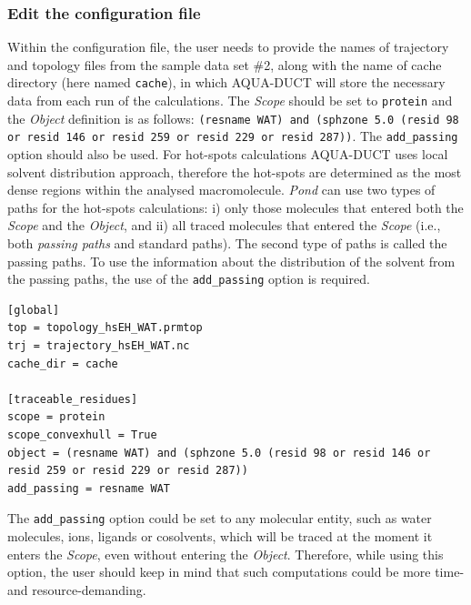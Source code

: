 \documentclass[9pt,tutorial, pubversion]{livecoms}
\begin{document}
\subsubsection{Edit the configuration file}
Within the configuration file, the user needs to provide the names of trajectory and topology files from the sample data set \#2, along with the name of cache directory (here named \texttt{cache}), in which AQUA-DUCT will store the necessary data from each run of the calculations. The \emph{Scope} should be set to \texttt{protein} and the \emph{Object} definition is as follows: \texttt{(resname WAT) and (sphzone 5.0 (resid 98 or resid 146 or resid 259 or resid 229 or resid 287))}. The \texttt{add\_passing} option should also be used. For hot-spots calculations AQUA-DUCT uses local solvent distribution approach, therefore the hot-spots are determined as the most dense regions within the analysed macromolecule. \textit{Pond} can use two types of paths for the hot-spots calculations: i) only those molecules that entered both the \textit{Scope} and the \textit{Object}, and ii) all traced molecules that entered the \textit{Scope} (i.e., both \textit{passing paths} and standard paths). The second type of paths is called the passing paths. To use the information about the distribution of the solvent from the passing paths, the use of the \texttt{add\_passing} option is required.
\begin{lstlisting}[columns=fullflexible]
[global]
top = topology_hsEH_WAT.prmtop
trj = trajectory_hsEH_WAT.nc
cache_dir = cache

[traceable_residues]
scope = protein
scope_convexhull = True
object = (resname WAT) and (sphzone 5.0 (resid 98 or resid 146 or resid 259 or resid 229 or resid 287))
add_passing = resname WAT
\end{lstlisting}
The \texttt{add\_passing} option could be set to any molecular entity, such as water molecules, ions, ligands or cosolvents, which will be traced at the moment it enters the \emph{Scope}, even without entering the \emph{Object}. Therefore, while using this option, the user should keep in mind that such computations could be more time- and resource-demanding.
\end{document}
